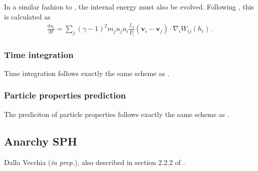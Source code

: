 In a similar fashion to \MinimalSPH, the internal energy must also be
evolved. Following \cite{Hopkins2013}, this is calculated as
\begin{align}
  \frac{\mathrm{d}u_i}{\mathrm{d}t} = \sum_j (\gamma - 1)^2 m_j u_j u_i
	\frac{f_{ij}}{\bar{P}_i}(\mathbf{v}_i - \mathbf{v}_j) \cdot
	\nabla_i W_{ij}(h_i)~.
  \label{eq:sph:pu:dudt}
\end{align}

\subsubsection{Time integration}

Time integration follows exactly the same scheme as \MinimalSPH.

\subsubsection{Particle properties prediction}

The prediciton of particle properties follows exactly the same scheme as
\MinimalSPH.



\subsection{Anarchy SPH}
Dalla Vecchia (\textit{in prep.}), also described in section 2.2.2 of
\cite{Schaller2015}.\\
\label{sec:sph:anarchy}
\tbd 
